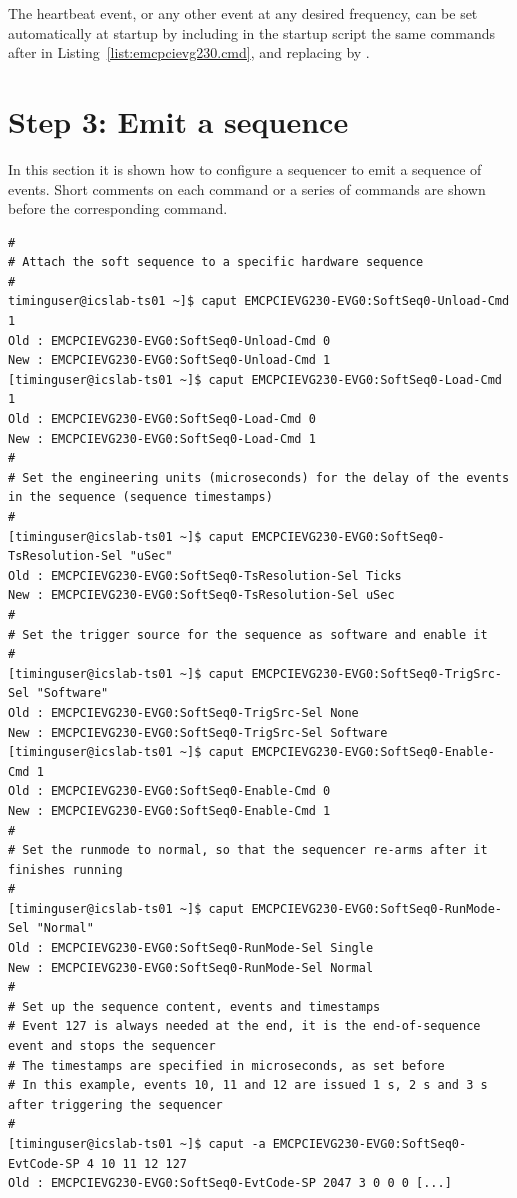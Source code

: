 \documentclass[11pt
  , a4paper
  , article
  , oneside
  , showtrims
]{memoir}
\begin{document}
The heartbeat event, or any other event at any desired frequency, can be set automatically at startup by including in the startup script the same commands after  in Listing~\ref{list:emcpcievg230.cmd}, and replacing  by .


\section{Step 3: Emit a sequence}
In this section it is shown how to configure a sequencer to emit a sequence of events. Short comments on each command or a series of commands are shown before the corresponding command.
\begin{lstlisting}[style=termstyle]
#
# Attach the soft sequence to a specific hardware sequence
#
timinguser@icslab-ts01 ~]$ caput EMCPCIEVG230-EVG0:SoftSeq0-Unload-Cmd 1
Old : EMCPCIEVG230-EVG0:SoftSeq0-Unload-Cmd 0
New : EMCPCIEVG230-EVG0:SoftSeq0-Unload-Cmd 1
[timinguser@icslab-ts01 ~]$ caput EMCPCIEVG230-EVG0:SoftSeq0-Load-Cmd 1
Old : EMCPCIEVG230-EVG0:SoftSeq0-Load-Cmd 0
New : EMCPCIEVG230-EVG0:SoftSeq0-Load-Cmd 1
#
# Set the engineering units (microseconds) for the delay of the events in the sequence (sequence timestamps)
#
[timinguser@icslab-ts01 ~]$ caput EMCPCIEVG230-EVG0:SoftSeq0-TsResolution-Sel "uSec"
Old : EMCPCIEVG230-EVG0:SoftSeq0-TsResolution-Sel Ticks
New : EMCPCIEVG230-EVG0:SoftSeq0-TsResolution-Sel uSec
#
# Set the trigger source for the sequence as software and enable it
#
[timinguser@icslab-ts01 ~]$ caput EMCPCIEVG230-EVG0:SoftSeq0-TrigSrc-Sel "Software"
Old : EMCPCIEVG230-EVG0:SoftSeq0-TrigSrc-Sel None
New : EMCPCIEVG230-EVG0:SoftSeq0-TrigSrc-Sel Software
[timinguser@icslab-ts01 ~]$ caput EMCPCIEVG230-EVG0:SoftSeq0-Enable-Cmd 1
Old : EMCPCIEVG230-EVG0:SoftSeq0-Enable-Cmd 0
New : EMCPCIEVG230-EVG0:SoftSeq0-Enable-Cmd 1
#
# Set the runmode to normal, so that the sequencer re-arms after it finishes running
#
[timinguser@icslab-ts01 ~]$ caput EMCPCIEVG230-EVG0:SoftSeq0-RunMode-Sel "Normal"
Old : EMCPCIEVG230-EVG0:SoftSeq0-RunMode-Sel Single
New : EMCPCIEVG230-EVG0:SoftSeq0-RunMode-Sel Normal
#
# Set up the sequence content, events and timestamps
# Event 127 is always needed at the end, it is the end-of-sequence event and stops the sequencer
# The timestamps are specified in microseconds, as set before
# In this example, events 10, 11 and 12 are issued 1 s, 2 s and 3 s after triggering the sequencer
#
[timinguser@icslab-ts01 ~]$ caput -a EMCPCIEVG230-EVG0:SoftSeq0-EvtCode-SP 4 10 11 12 127
Old : EMCPCIEVG230-EVG0:SoftSeq0-EvtCode-SP 2047 3 0 0 0 [...]

\end{lstlisting}
\end{document}
